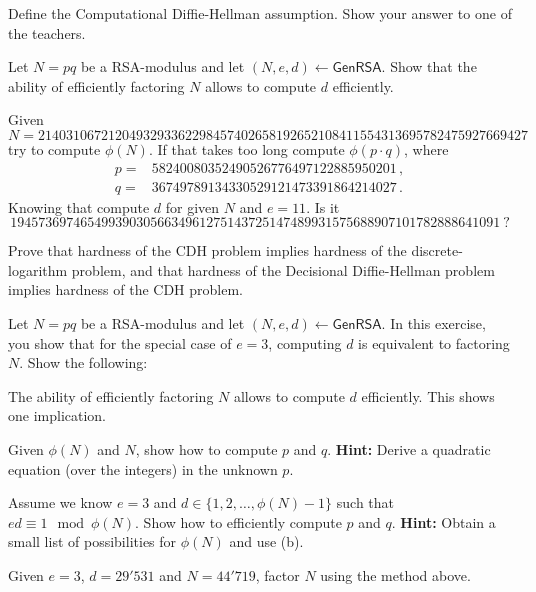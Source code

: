 \documentclass[a4paper,10pt,landscape,twocolumn]{scrartcl}
\begin{document}
\begin{exercise}
Define the Computational Diffie-Hellman assumption.
Show your answer to one of the teachers.
\end{exercise}

\begin{exercise}[RSA]
Let $N=pq$ be a RSA-modulus and let
  $(N,e,d) \leftarrow \mathsf{GenRSA}$. 
Show that the ability of efficiently factoring $N$ allows to compute $d$
  efficiently.
  
  Given 
  \begin{equation*}
  N=2140310672120493293362298457402658192652108411554313695782475927669427
  \end{equation*}
  try to compute $\phi(N)$. If that takes too long compute $\phi(p\cdot q)$, where 
  \begin{align*}
  p=&58240080352490526776497122885950201 \, ,\\
  q=&36749789134330529121473391864214027 \, .
  \end{align*}
  Knowing that compute $d$ for given $N$ and $e=11$. Is it 
  \begin{equation*}
  1945736974654993903056634961275143725147489931575688907101782888641091 \  ?
  \end{equation*}
\end{exercise}

\begin{bonusexercise}
Prove that hardness of the CDH problem implies hardness of the discrete-logarithm problem, and that hardness of the Decisional Diffie-Hellman problem implies hardness of the CDH problem.
\end{bonusexercise}

\begin{bonusexercise}
Let $N=pq$ be a RSA-modulus and let
 $(N,e,d) \leftarrow \mathsf{GenRSA}$. In this exercise, you show
 that for the special case of $e=3$, computing $d$ is equivalent to
 factoring $N$. Show the following:
\begin{subex}
The ability of efficiently factoring $N$ allows to compute $d$
 efficiently. This shows one implication.
\end{subex}

\begin{subex}
Given $\phi(N)$ and $N$, show how to compute $p$ and $q$. 
\textbf{Hint:} Derive a quadratic equation (over the integers) in the
   unknown $p$.
\end{subex}
 
\begin{subex}
Assume we know $e=3$ and $d \in \{1,2,\ldots,\phi(N)-1\}$ such
   that $ed \equiv 1 \mod \phi(N)$. Show how to efficiently compute
   $p$ and $q$. \textbf{Hint:} Obtain a small list of possibilities for
   $\phi(N)$ and use (b).
\end{subex}

\begin{subex} 
Given $e=3$, $d=29'531$ and $N=44'719$, factor $N$ using the
 method above.
\end{subex}
\end{bonusexercise}
\end{document}
